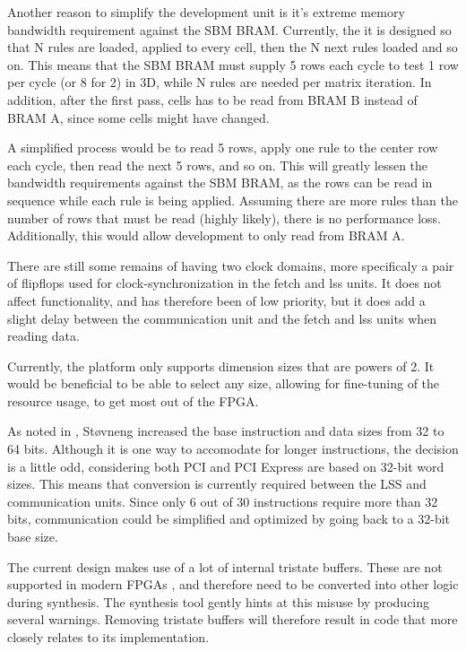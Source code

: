 Another reason to simplify the development unit is it's extreme memory bandwidth requirement against the SBM BRAM.
Currently, the it is designed so that N rules are loaded, applied to every cell, then the N next rules loaded and so on.
This means that the SBM BRAM must supply 5 rows each cycle to test 1 row per cycle (or 8 for 2) in 3D, while N rules are needed per matrix iteration.
In addition, after the first pass, cells has to be read from BRAM B instead of BRAM A, since some cells might have changed.

A simplified process would be to read 5 rows, apply one rule to the center row each cycle, then read the next 5 rows, and so on.
This will greatly lessen the bandwidth requirements against the SBM BRAM, as the rows can be read in sequence while each rule is being applied.
Assuming there are more rules than the number of rows that must be read (highly likely), there is no performance loss.
Additionally, this would allow development to only read from BRAM A.

There are still some remains of having two clock domains, more specificaly a pair of flipflops used for clock-synchronization in the fetch and lss units.
It does not affect functionality, and has therefore been of low priority, but it does add a slight delay between the communication unit and the fetch and lss units when reading data.

Currently, the platform only supports dimension sizes that are powers of 2.
It would be beneficial to be able to select any size, allowing for fine-tuning of the resource usage, to get most out of the FPGA.

As noted in \cite{stovneng2014sblock}, Støvneng increased the base instruction and data sizes from 32 to 64 bits.
Although it is one way to accomodate for longer instructions, the decision is a little odd, considering both PCI and PCI Express are based on 32-bit word sizes.
This means that conversion is currently required between the LSS and communication units.
Since only 6 out of 30 instructions require more than 32 bits, communication could be simplified and optimized by going back to a 32-bit base size.

The current design makes use of a lot of internal tristate buffers.
These are not supported in modern FPGAs \cite{koch2008buses}, and therefore need to be converted into other logic during synthesis.
The synthesis tool gently hints at this misuse by producing several warnings.
Removing tristate buffers will therefore result in code that more closely relates to its implementation.

